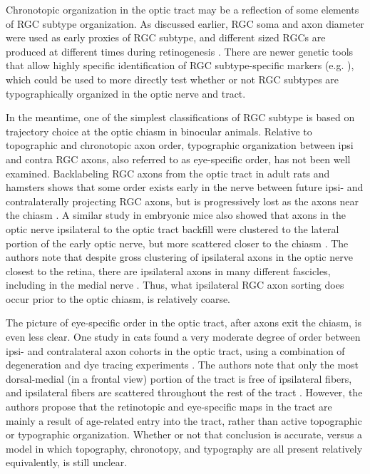 Chronotopic organization in the optic tract may be a reflection of some elements of RGC subtype organization.
As discussed earlier, RGC soma and axon diameter were used as early proxies of RGC subtype, and different sized RGCs are produced at different times during retinogenesis \cite{rapaport1995spatiotemporal,reese1994birthdates}.
There are newer genetic tools that allow highly specific identification of RGC subtype-specific markers (e.g. \cite{blackshaw2004genomic,dhande2014retinal,baden2016functional,rivlin2011transgenic}), which could be used to more directly test whether or not RGC subtypes are typographically organized in the optic nerve and tract.%

In the meantime, one of the simplest classifications of RGC subtype is based on trajectory choice at the optic chiasm in binocular animals.
Relative to topographic and chronotopic axon order, typographic organization between ipsi and contra RGC axons, also referred to as eye-specific order, has not been well examined.
Backlabeling RGC axons from the optic tract in adult rats and hamsters shows that some order exists early in the nerve between future ipsi- and contralaterally projecting RGC axons, but is progressively lost as the axons near the chiasm \cite{baker1989distribution}.
A similar study in embryonic mice also showed that axons in the optic nerve ipsilateral to the optic tract backfill were clustered to the lateral portion of the early optic nerve, but more scattered closer to the chiasm \cite{colello1990early}.
The authors note that despite gross clustering of ipsilateral axons in the optic nerve closest to the retina, there are ipsilateral axons in many different fascicles, including in the medial nerve \cite{colello1990early}.
Thus, what ipsilateral RGC axon sorting does occur prior to the optic chiasm, is relatively coarse.

The picture of eye-specific order in the optic tract, after axons exit the chiasm, is even less clear.
One study in cats found a very moderate degree of order between ipsi- and contralateral axon cohorts in the optic tract, using a combination of degeneration and dye tracing experiments \cite{torrealba1982studies}.
The authors note that only the most dorsal-medial (in a frontal view) portion of the tract is free of ipsilateral fibers, and ipsilateral fibers are scattered throughout the rest of the tract \cite{torrealba1982studies}.
However, the authors propose that the retinotopic and eye-specific maps in the tract are mainly a result of age-related entry into the tract, rather than active topographic or typographic organization.
Whether or not that conclusion is accurate, versus a model in which topography, chronotopy, and typography are all present relatively equivalently, is still unclear.

